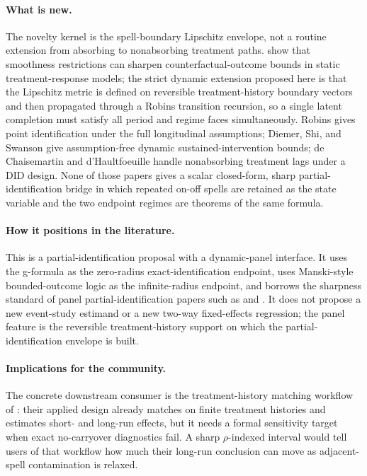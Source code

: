 \documentclass[11pt]{article}
\theoremstyle{definition}
\theoremstyle{plain}
\theoremstyle{remark}
\begin{document}
\paragraph{What is new.}
The novelty kernel is the spell-boundary Lipschitz envelope, not a routine
extension from absorbing to nonabsorbing treatment paths.  \citet{KimKwonKwonLee2018}
show that smoothness restrictions can sharpen counterfactual-outcome bounds in
static treatment-response models; the strict dynamic extension proposed here is
that the Lipschitz metric is defined on reversible treatment-history boundary
vectors and then propagated through a Robins transition recursion, so a single
latent completion must satisfy all period and regime faces simultaneously.  Robins
\citep{Robins1986} gives point identification under the full longitudinal
assumptions; Diemer, Shi, and Swanson \citep{DiemerShiSwanson2024} give
assumption-free dynamic sustained-intervention bounds; de Chaisemartin and
d'Haultfoeuille \citep{DeChaisemartinDHaultfoeuille2024} handle nonabsorbing
treatment lags under a DID design.  None of those papers gives a scalar
closed-form, sharp partial-identification bridge in which repeated on-off
spells are retained as the state variable and the two endpoint regimes are
theorems of the same formula.

\paragraph{How it positions in the literature.}
This is a partial-identification proposal with a dynamic-panel interface.  It
uses the g-formula as the zero-radius exact-identification endpoint, uses
Manski-style bounded-outcome logic as the infinite-radius endpoint, and borrows
the sharpness standard of panel partial-identification papers such as
\citet{ChernozhukovFernandezValHahnNewey2013} and \citet{JunLeeShin2016}.  It does
not propose a new event-study estimand or a new two-way fixed-effects
regression; the panel feature is the reversible treatment-history support on
which the partial-identification envelope is built.

\paragraph{Implications for the community.}
The concrete downstream consumer is the treatment-history matching workflow of
\citet{ImaiKimWang2023}: their applied design already matches on finite
treatment histories and estimates short- and long-run effects, but it needs a
formal sensitivity target when exact no-carryover diagnostics fail.  A sharp
\(\rho\)-indexed interval would tell users of that workflow how much their
long-run conclusion can move as adjacent-spell contamination is relaxed.
\end{document}
